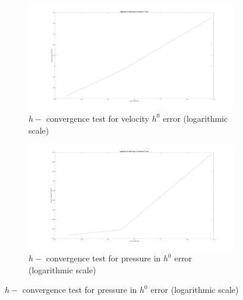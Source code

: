 \documentclass[a4paper]{book}
\begin{document}
\begin{figure}
\begin{subfigure}{\textwidth}	
  \includegraphics[width=\linewidth]{h0_velocity_log_stokes.jpg}
  \caption{$h-$ convergence test for velocity $h^0$ error (logarithmic scale)}
  \label{fig:vel_stoke_conv_log_h0}
\end{subfigure}
\begin{subfigure}{\textwidth}	
  \includegraphics[width=\linewidth]{h0_pressure_log_stokes.jpg}
  \caption{$h-$ convergence test for pressure in $h^0$ error (logarithmic scale)}
  \label{fig:pre_stoke_conv_log_h0}
\end{subfigure}
\label{fig:h0_stokes}
\end{figure}
\end{document}
